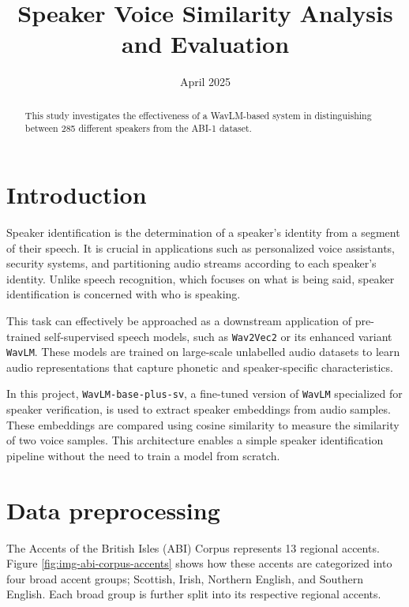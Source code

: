 \documentclass[conference]{IEEEtran}
\begin{document}
	
\title{Speaker Voice Similarity Analysis and Evaluation}

	
\author{
	\date{April 2025}
	
}

\maketitle

\begin{abstract}
This study investigates the effectiveness of a WavLM-based system in distinguishing between 285 different speakers from the ABI-1 dataset. \end{abstract}



\section{Introduction}

Speaker identification is the determination of a speaker's identity from a segment of their speech. It is crucial in applications such as personalized voice assistants, security systems, and partitioning audio streams according to each speaker's identity. Unlike speech recognition, which focuses on what is being said, speaker identification is concerned with who is speaking.

This task can effectively be approached as a downstream application of pre-trained self-supervised speech models, such as \texttt{Wav2Vec2}\cite{baevski2020wav2vec} or its enhanced variant \texttt{WavLM}\cite{chen2022wavlm}. These models are trained on large-scale unlabelled audio datasets to learn audio representations that capture phonetic and speaker-specific characteristics.

In this project, \texttt{WavLM-base-plus-sv}, a fine-tuned version of \texttt{WavLM} specialized for speaker verification, is used to extract speaker embeddings from audio samples. These embeddings are compared using cosine similarity to measure the similarity of two voice samples. This architecture enables a simple speaker identification pipeline without the need to train a model from scratch.


\section{Data preprocessing}

The Accents of the British Isles (ABI) Corpus represents 13 regional accents. Figure \ref{fig:img-abi-corpus-accents} shows how these accents are categorized into four broad accent groups; Scottish, Irish, Northern English, and Southern English. Each broad group is further split into its respective regional accents\cite{najafian2016improving}.
\end{document}
